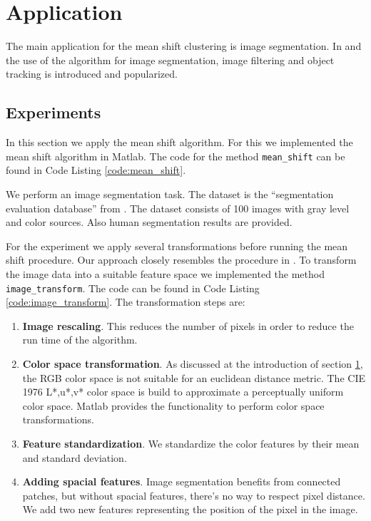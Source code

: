 \documentclass{article}
\begin{document}
\section{Application} \label{sec:application}

The main application for the mean shift clustering is image segmentation. In \cite{Comaniciu.2002} and \cite{Comaniciu.2003} the use of the algorithm for image segmentation, image filtering and object tracking is introduced and popularized.

\subsection{Experiments}

In this section we apply the mean shift algorithm. For this we implemented the mean shift algorithm in Matlab. The code for the method \texttt{mean\_shift} can be found in Code Listing \ref{code:mean_shift}.

We perform an image segmentation task. The dataset is the ``segmentation evaluation database'' from \cite{Alpert.2012}. The dataset consists of 100 images with gray level and color sources. Also human segmentation results are provided.

For the experiment we apply several transformations before running the mean shift procedure. Our approach closely resembles the procedure in \cite{Comaniciu.2002}. To transform the image data into a suitable feature space we implemented the method \texttt{image\_transform}. The code can be found in Code Listing \ref{code:image_transform}. The transformation steps are:

\begin{enumerate}
	\item \textbf{Image rescaling}. This reduces the number of pixels in order to reduce the run time of the algorithm.
	\item \textbf{Color space transformation}. As discussed at the introduction of section \ref{sec:application}, the RGB color space is not suitable for an euclidean distance metric. The CIE 1976 L*,u*,v* color space is build to approximate a perceptually uniform color space. Matlab provides the functionality to perform color space transformations.
	\item \textbf{Feature standardization}. We standardize the color features by their mean and standard deviation.
	\item \textbf{Adding spacial features}. Image segmentation benefits from connected patches, but without spacial features, there's no way to respect pixel distance. We add two new features representing the position of the pixel in the image.
\end{enumerate}
\end{document}
